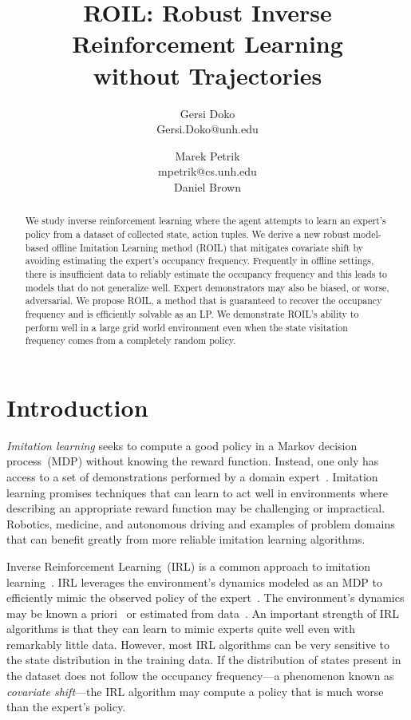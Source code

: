 \documentclass[10pt]{article}
\title{ROIL: Robust Inverse Reinforcement Learning\\
  without Trajectories}
\author{Gersi Doko \\
        Gersi.Doko@unh.edu \\
        \and 
        Marek Petrik \\
        mpetrik@cs.unh.edu \\
        Daniel Brown }
\renewcommand{\cite}{\citep}
\begin{document}
\maketitle

\begin{abstract}
We study inverse reinforcement learning where the agent attempts to learn an expert's policy from a dataset of collected state, action tuples. We derive a new robust model-based offline Imitation Learning method (ROIL) that mitigates covariate shift by avoiding estimating the expert's occupancy frequency. Frequently in offline settings, there is insufficient data to reliably estimate the occupancy frequency and this leads to models that do not generalize well. Expert demonstrators may also be biased, or worse, adversarial. We propose ROIL, a method that is guaranteed to recover the occupancy frequency and is efficiently solvable as an LP. We demonstrate ROIL's ability to perform well in a large grid world environment even when the state visitation frequency comes from a completely random policy.
\end{abstract}

\section{Introduction}

\emph{Imitation learning} seeks to compute a good policy in a Markov decision process~(MDP) without knowing the reward function. Instead, one only has access to a set of demonstrations performed by a domain expert~\cite{chang2021mitigating, Panaganti2023, Spencer2021, Rashidinejad2022}. Imitation learning promises techniques that can learn to act well in environments where describing an appropriate reward function may be challenging or impractical. Robotics, medicine, and autonomous driving and examples of problem domains that can benefit greatly from more reliable imitation learning algorithms. 

Inverse Reinforcement Learning~(IRL) is a common approach to imitation learning~\cite{abbeel2004, Javed2021, Brown2020, Brown2018b, Brown2018a}. IRL leverages the environment's dynamics modeled as an MDP to efficiently mimic the observed policy of the expert~\cite{Arora2020}. The environment's dynamics may be known a priori~\cite{Syed2008, lacotte2019} or estimated from data~\cite{chang2021mitigating, Ho2016}. An important strength of IRL algorithms is that they can learn to mimic experts quite well even with remarkably little data. However, most IRL algorithms can be very sensitive to the state distribution in the training data. If the distribution of states present in the dataset does not follow the occupancy frequency---a phenomenon known as \emph{covariate shift}---the IRL algorithm may compute a policy that is much worse than the expert's policy. 
\end{document}
